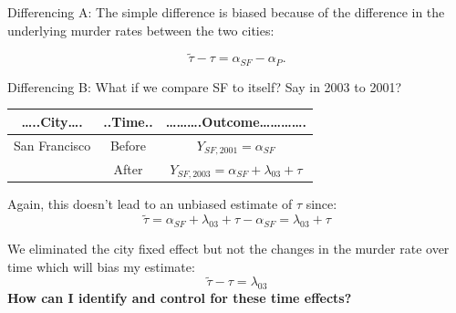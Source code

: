 \documentclass[
  ignorenonframetext,
]{beamer}
\begin{document}
\begin{frame}{Differencing A:}
\protect\hypertarget{differencing-a-1}{}
The simple difference is biased because of the difference in the
underlying murder rates between the two cities:

\[
\tilde{\tau}-\tau=\alpha_{SF}-\alpha_{P}. 
\]
\end{frame}

\begin{frame}{Differencing B:}
\protect\hypertarget{differencing-b}{}
What if we compare SF to itself? Say in 2003 to 2001?

\begin{longtable}[]{@{}ccc@{}}
\toprule()
\ldots..City\ldots. & ..Time.. &
\ldots\ldots\ldots.Outcome\ldots\ldots\ldots\ldots. \\
\midrule()
\endhead
San Francisco & Before & \(Y_{SF,2001}=\alpha_{SF}\) \\
& After & \(Y_{SF,2003}=\alpha_{SF}+\lambda_{03}+\tau\) \\
\bottomrule()
\end{longtable}

Again, this doesn't lead to an unbiased estimate of \(\tau\) since: \[
\tilde{\tau}=\alpha_{SF}+\lambda_{03}+\tau-\alpha_{SF}=\lambda_{03}+\tau
\]

We eliminated the city fixed effect but not the changes in the murder
rate over time which will bias my estimate: \[
\tilde{\tau}-\tau=\lambda_{03}
\] \textbf{How can I identify and control for these time effects?}
\end{frame}
\end{document}
